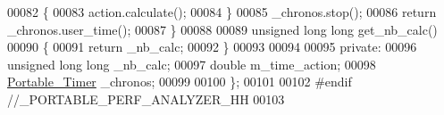 \begin{DoxyCode}
00082     \{
00083       action.calculate();
00084     \}
00085     \_chronos.stop();
00086     \textcolor{keywordflow}{return} \_chronos.user\_time();
00087   \}
00088 
00089   \textcolor{keywordtype}{unsigned} \textcolor{keywordtype}{long} \textcolor{keywordtype}{long} get\_nb\_calc()
00090   \{
00091     \textcolor{keywordflow}{return} \_nb\_calc;
00092   \}
00093 
00094 
00095 \textcolor{keyword}{private}:
00096   \textcolor{keywordtype}{unsigned} \textcolor{keywordtype}{long} \textcolor{keywordtype}{long} \_nb\_calc;
00097   \textcolor{keywordtype}{double} m\_time\_action;
00098   \hyperlink{class_portable___timer}{Portable\_Timer} \_chronos;
00099 
00100 \};
00101 
00102 \textcolor{preprocessor}{#endif //\_PORTABLE\_PERF\_ANALYZER\_HH}
00103 
\end{DoxyCode}
